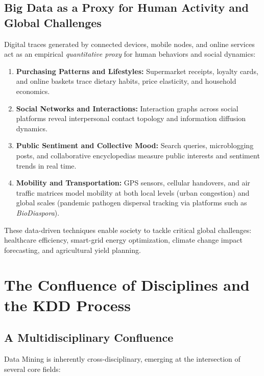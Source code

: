 \subsection{Big Data as a Proxy for Human Activity and Global Challenges}
Digital traces generated by connected devices, mobile nodes, and online services act as an empirical \textit{quantitative proxy} for human behaviors and social dynamics:

\begin{enumerate}
    \item \textbf{Purchasing Patterns and Lifestyles:} Supermarket receipts, loyalty cards, and online baskets trace dietary habits, price elasticity, and household economics.
    \item \textbf{Social Networks and Interactions:} Interaction graphs across social platforms reveal interpersonal contact topology and information diffusion dynamics.
    \item \textbf{Public Sentiment and Collective Mood:} Search queries, microblogging posts, and collaborative encyclopedias measure public interests and sentiment trends in real time.
    \item \textbf{Mobility and Transportation:} GPS sensors, cellular handovers, and air traffic matrices model mobility at both local levels (urban congestion) and global scales (pandemic pathogen dispersal tracking via platforms such as \textit{BioDiaspora}).
\end{enumerate}

These data-driven techniques enable society to tackle critical global challenges: healthcare efficiency, smart-grid energy optimization, climate change impact forecasting, and agricultural yield planning.

\FloatBarrier
\section{The Confluence of Disciplines and the KDD Process}

\subsection{A Multidisciplinary Confluence}
Data Mining is inherently cross-disciplinary, emerging at the intersection of several core fields:


